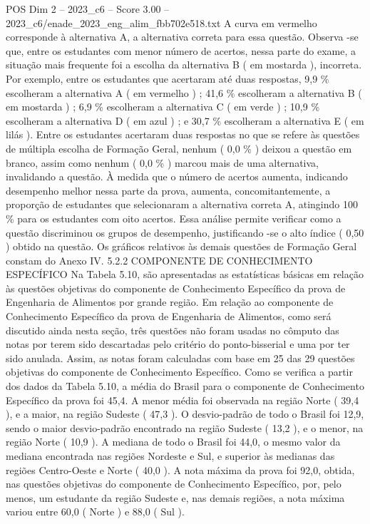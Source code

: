\begin{textsample}{POS Dim 2 – 2023\_c6 – Score 3.00 – 2023\_c6/enade\_2023\_eng\_alim\_fbb702e518.txt}
A curva em vermelho corresponde à alternativa A, a alternativa correta para essa questão.
Observa -se que, entre os estudantes com menor número de acertos, nessa parte do exame, a situação mais frequente foi a escolha da alternativa B ( em mostarda ), incorreta.
Por exemplo, entre os estudantes que acertaram até duas respostas, 9,9 \% escolheram a alternativa A ( em vermelho ) ; 41,6 \% escolheram a alternativa B ( em mostarda ) ; 6,9 \% escolheram a alternativa C ( em verde ) ; 10,9 \% escolheram a alternativa D ( em azul ) ; e 30,7 \% escolheram a alternativa E ( em lilás ).
Entre os estudantes acertaram duas respostas no que se refere às questões de múltipla escolha de Formação Geral, nenhum ( 0,0 \% ) deixou a questão em branco, assim como nenhum ( 0,0 \% ) marcou mais de uma alternativa, invalidando a questão.
À medida que o número de acertos aumenta, indicando desempenho melhor nessa parte da prova, aumenta, concomitantemente, a proporção de estudantes que selecionaram a alternativa correta A, atingindo 100 \% para os estudantes com oito acertos.
Essa análise permite verificar como a questão discriminou os grupos de desempenho, justificando -se o alto índice ( 0,50 ) obtido na questão.
Os gráficos relativos às demais questões de Formação Geral constam do Anexo IV. 5.2.2 COMPONENTE DE CONHECIMENTO ESPECÍFICO Na Tabela 5.10, são apresentadas as estatísticas básicas em relação às questões objetivas do componente de Conhecimento Específico da prova de Engenharia de Alimentos por grande região.
Em relação ao componente de Conhecimento Específico da prova de Engenharia de Alimentos, como será discutido ainda nesta seção, três questões não foram usadas no cômputo das notas por terem sido descartadas pelo critério do ponto-bisserial e uma por ter sido anulada.
Assim, as notas foram calculadas com base em 25 das 29 questões objetivas do componente de Conhecimento Específico.
Como se verifica a partir dos dados da Tabela 5.10, a média do Brasil para o componente de Conhecimento Específico da prova foi 45,4.
A menor média foi observada na região Norte ( 39,4 ), e a maior, na região Sudeste ( 47,3 ).
O desvio-padrão de todo o Brasil foi 12,9, sendo o maior desvio-padrão encontrado na região Sudeste ( 13,2 ), e o menor, na região Norte ( 10,9 ).
A mediana de todo o Brasil foi 44,0, o mesmo valor da mediana encontrada nas regiões Nordeste e Sul, e superior às medianas das regiões Centro-Oeste e Norte ( 40,0 ).
A nota máxima da prova foi 92,0, obtida, nas questões objetivas do componente de Conhecimento Específico, por, pelo menos, um estudante da região Sudeste e, nas demais regiões, a nota máxima variou entre 60,0 ( Norte ) e 88,0 ( Sul ).

\end{textsample}
